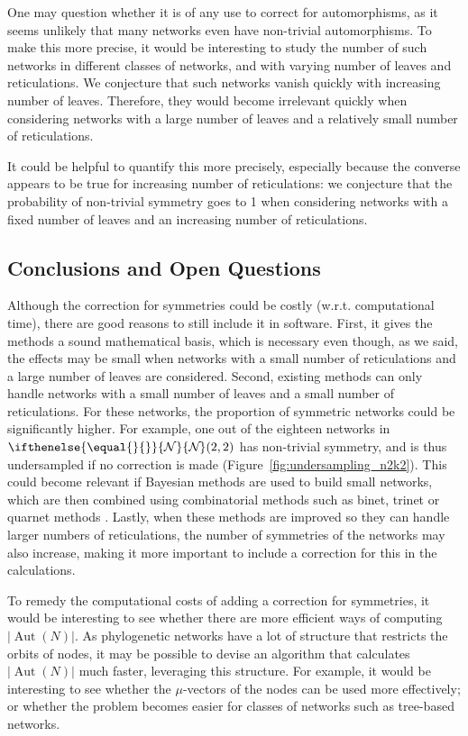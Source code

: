 \documentclass{article}
\theoremstyle{definition}
\newcommand{\N}[1][]{
\ifthenelse{\equal{#1}{}}{\mathcal{N}}{\mathcal{N}_{#1}}%
}
\DeclareMathOperator{\Aut}{Aut}
\begin{document}
One may question whether it is of any use to correct for automorphisms, as it seems unlikely that many networks even have non-trivial automorphisms. To make this more precise, it would be interesting to study the number of such networks in different classes of networks, and with varying number of leaves and reticulations. We conjecture that such networks vanish quickly with increasing number of leaves. 
Therefore, they would become irrelevant quickly when considering networks with a large number of leaves and a relatively small number of reticulations. 

It could be helpful to quantify this more precisely, especially because the converse appears to be true for increasing number of reticulations: we conjecture that the probability of non-trivial symmetry goes to 1 when considering networks with a fixed number of leaves and an increasing number of reticulations.


\subsection{Conclusions and Open Questions}
Although the correction for symmetries could be costly (w.r.t. computational time), there are good reasons to still include it in software. First, it gives the methods a sound mathematical basis, which is necessary even though, as we said, the effects may be small when networks with a small number of reticulations and a large number of leaves are considered.
Second, existing methods can only handle networks with a small number of leaves and a small number of reticulations. For these networks, the proportion of symmetric networks could be significantly higher. For example, one out of the eighteen networks in $\N(2,2)$ has non-trivial symmetry, and is thus undersampled if no correction is made (Figure~\ref{fig:undersampling_n2k2}). This could become relevant if Bayesian methods are used to build small networks, which are then combined using combinatorial methods such as binet, trinet or quarnet methods \cite{van2014trinets,oldman2016trilonet,huber2017reconstructing,huber2018quarnet,gross2020distinguishing}. Lastly, when these methods are improved so they can handle larger numbers of reticulations, the number of symmetries of the networks may also increase, making it more important to include a correction for this in the calculations.

To remedy the computational costs of adding a correction for symmetries, it would be interesting to see whether there are more efficient ways of computing $|\Aut(N)|$. As phylogenetic networks have a lot of structure that restricts the orbits of nodes, it may be possible to devise an algorithm that calculates $|\Aut(N)|$ much faster, leveraging this structure. For example, it would be interesting to see whether the $\mu$-vectors of the nodes can be used more effectively; or whether the problem becomes easier for classes of networks such as tree-based networks.
\end{document}
